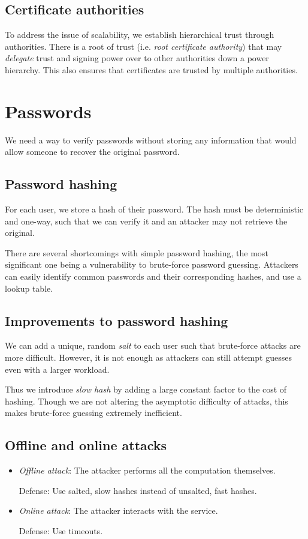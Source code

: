 \subsection{Certificate authorities}
To address the issue of scalability, we establish hierarchical trust through authorities. There is a root of trust (i.e. \emph{root certificate authority}) that may \emph{delegate} trust and signing power over to other authorities down a power hierarchy. This also ensures that certificates are trusted by multiple authorities.

\section{Passwords}
We need a way to verify passwords without storing any information that would allow someone to recover the original password.

\subsection{Password hashing}
For each user, we store a hash of their password. The hash must be deterministic and one-way, such that we can verify it and an attacker may not retrieve the original. 

\medskip

There are several shortcomings with simple password hashing, the most significant one being a vulnerability to brute-force password guessing. Attackers can easily identify common passwords and their corresponding hashes, and use a lookup table.

\subsection{Improvements to password hashing}
We can add a unique, random \emph{salt} to each user such that brute-force attacks are more difficult. However, it is not enough as attackers can still attempt guesses even with a larger workload. 

\medskip
Thus we introduce \emph{slow hash} by adding a large constant factor to the cost of hashing. Though we are not altering the asymptotic difficulty of attacks, this makes brute-force guessing extremely inefficient.

\subsection{Offline and online attacks}
\begin{itemize}
    \item \emph{Offline attack}: The attacker performs all the computation themselves.
    
    Defense: Use salted, slow hashes instead of unsalted, fast hashes.

   \item \emph{Online attack}: The attacker interacts with the service.
   
    Defense: Use timeouts.

\end{itemize}

